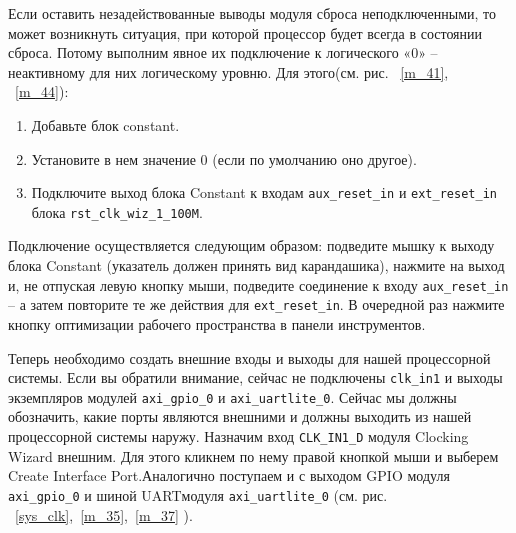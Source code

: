 \documentclass[a4paper,oneside ,14pt]{extreport}
\begin{document}
Если оставить незадействованные выводы модуля сброса неподключенными, 
то может возникнуть ситуация, при которой процессор будет всегда в состоянии 
сброса. Потому выполним явное их подключение к логического «0» – неактивному 
для них логическому уровню. Для этого(см. рис. ~\ref{m_41}, ~\ref{m_44}):

\begin{enumerate}
	\item Добавьте блок constant.
	\item Установите в нем значение 0 (если по умолчанию оно другое).
	\item Подключите выход блока Constant к входам \verb|aux_reset_in| и  \verb|ext_reset_in|
блока \verb|rst_clk_wiz_1_100M|.
\end{enumerate}

Подключение осуществляется следующим образом: подведите мышку к 
выходу блока Constant (указатель должен принять вид карандашика), нажмите на 
выход и, не отпуская левую кнопку мыши, подведите соединение к входу 
 \verb|aux_reset_in| – а затем повторите те же действия для \verb|ext_reset_in|. В очередной раз 
нажмите кнопку оптимизации рабочего пространства в панели инструментов. 

Теперь необходимо создать внешние входы и выходы для нашей 
процессорной системы. Если вы обратили внимание, сейчас не подключены  \verb|clk_in1| 
и выходы экземпляров модулей \verb|axi_gpio_0| и  \verb|axi_uartlite_0|. Сейчас мы должны 
обозначить, какие порты являются внешними и должны выходить из нашей 
процессорной системы наружу.
Назначим вход \verb|CLK_IN1_D| модуля Clocking Wizard внешним. Для этого кликнем 
по нему правой кнопкой мыши и выберем Create Interface Port.Аналогично поступаем и с выходом GPIO модуля \verb|axi_gpio_0| и шиной UARTмодуля  \verb|axi_uartlite_0| (см. рис. ~\ref{sys_clk},~\ref{m_35},~\ref{m_37} ). 
\end{document}
